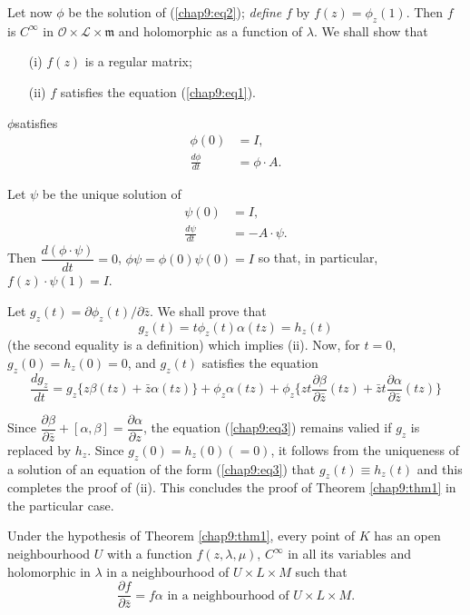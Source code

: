 Let now $\phi$ be the solution of (\ref{chap9:eq2}); \textit{define} $f$ by $f(z) =
\phi_z(1)$. Then $f$ is $C^\infty$ in $\mathscr{O} \times \mathscr{L}
\times \mathfrak{m}$ and holomorphic as a function of $\lambda$. We
shall show that 
\begin{itemize}
\item[(i)] $f(z)$ is a regular matrix;

\item[(ii)] $f$ satisfies the equation (\ref{chap9:eq1}). 
\end{itemize}

\medskip
{} $\phi$\pageoriginale satisfies
\begin{align*}
\phi(0) & = I, \\
\frac{d\phi}{dt} & = \phi \cdot A.
\end{align*}

Let $\psi$ be the unique solution of 
\begin{align*}
\psi(0) & = I, \\
\frac{d\psi}{dt} & = - A \cdot \psi.
\end{align*}
Then $\dfrac{d(\phi \cdot \psi)}{dt} =0$, $\phi \psi = \phi(0) \psi
(0)= I$ so that, in particular, $f(z)\cdot \psi (1) = I$. 

\medskip
{}
Let $g_z(t) = \partial \phi_z (t) / \partial \bar{z}$. We shall prove
that 
$$
g_z(t) = t\phi_z (t) \alpha (tz) = h_z(t)
$$
(the second equality is a definition) which implies (ii). Now, for
$t=0$, $g_z (0) = h_z (0) =0$, and $g_z (t)$ satisfies the equation
\begin{equation*}
\frac{dg_z}{dt} = g_z \{ z \beta (tz) + \bar{z} \alpha (tz)\} + \phi_z
\alpha (tz) + \phi_z \{zt \frac{\partial \beta}{\partial \bar{z}} (tz)
+ \bar{z} t \frac{\partial \alpha}{\partial \bar{z}} (tz)\}
\tag{3}\label{chap9:eq3}
\end{equation*}

Since $\dfrac{\partial \beta}{\partial \bar{z}} + [\alpha, \beta] =
\dfrac{\partial \alpha}{\partial z}$, the equation (\ref{chap9:eq3}) remains valied
if $g_z$ is replaced by $h_z$. Since $g_z(0) = h_z(0) (=0)$, it
follows from the uniqueness of a solution of an equation of the form
(\ref{chap9:eq3}) that $g_z (t) \equiv h_z (t)$ and this completes the proof of
(ii). This concludes the proof of Theorem \ref{chap9:thm1} in the particular case. 

\begin{coro*}
Under the hypothesis of Theorem \ref{chap9:thm1}, every point of $K$ has an open
neighbourhood $U$ with a function $f(z, \lambda, \mu)$, $C^\infty$ in
all its variables and holomorphic in $\lambda$ in a neighbourhood of
$U \times L \times M$ such that 
$$
\frac{\partial f}{\partial \bar{z}} = f\alpha \text{ in a
  neighbourhood of } U \times L \times M.  
$$
\end{coro*}

